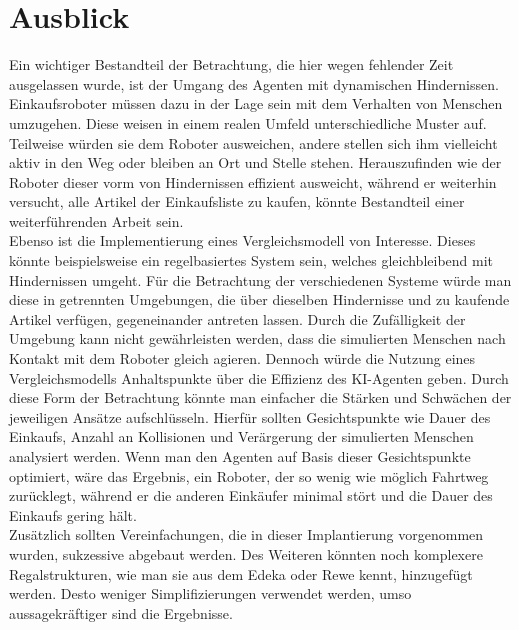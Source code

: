 \newpage
\section{Ausblick}
\label{ausblick}
Ein wichtiger Bestandteil der Betrachtung, die hier wegen fehlender Zeit ausgelassen wurde, ist der Umgang des Agenten mit dynamischen Hindernissen. Einkaufsroboter müssen dazu in der Lage sein mit dem Verhalten von Menschen umzugehen. Diese weisen in einem realen Umfeld unterschiedliche Muster auf. Teilweise würden sie dem Roboter ausweichen, andere stellen sich ihm vielleicht aktiv in den Weg oder bleiben an Ort und Stelle stehen. Herauszufinden wie der Roboter dieser vorm von Hindernissen effizient ausweicht, während er weiterhin versucht, alle Artikel der Einkaufsliste zu kaufen, könnte Bestandteil einer weiterführenden Arbeit sein. 
\\
Ebenso ist die Implementierung eines Vergleichsmodell von Interesse. Dieses könnte beispielsweise ein regelbasiertes System sein, welches gleichbleibend mit Hindernissen umgeht. Für die Betrachtung der verschiedenen Systeme würde man diese in getrennten Umgebungen, die über dieselben Hindernisse und zu kaufende Artikel verfügen, gegeneinander antreten lassen. Durch die Zufälligkeit der Umgebung kann nicht gewährleisten werden, dass die simulierten Menschen nach Kontakt mit dem Roboter gleich agieren. Dennoch würde die Nutzung eines Vergleichsmodells Anhaltspunkte über die Effizienz des KI-Agenten geben. Durch diese Form der Betrachtung könnte man einfacher die Stärken und Schwächen der jeweiligen Ansätze aufschlüsseln. Hierfür sollten Gesichtspunkte wie Dauer des Einkaufs, Anzahl an Kollisionen und Verärgerung der simulierten Menschen analysiert werden. Wenn man den Agenten auf Basis dieser Gesichtspunkte optimiert, wäre das Ergebnis, ein Roboter, der so wenig wie möglich Fahrtweg zurücklegt, während er die anderen Einkäufer minimal stört und die Dauer des Einkaufs gering hält. 
\\
Zusätzlich sollten Vereinfachungen, die in dieser Implantierung vorgenommen wurden, sukzessive abgebaut werden. Des Weiteren könnten noch komplexere Regalstrukturen, wie man sie aus dem Edeka oder Rewe kennt, hinzugefügt werden. Desto weniger Simplifizierungen verwendet werden, umso aussagekräftiger sind die Ergebnisse.

